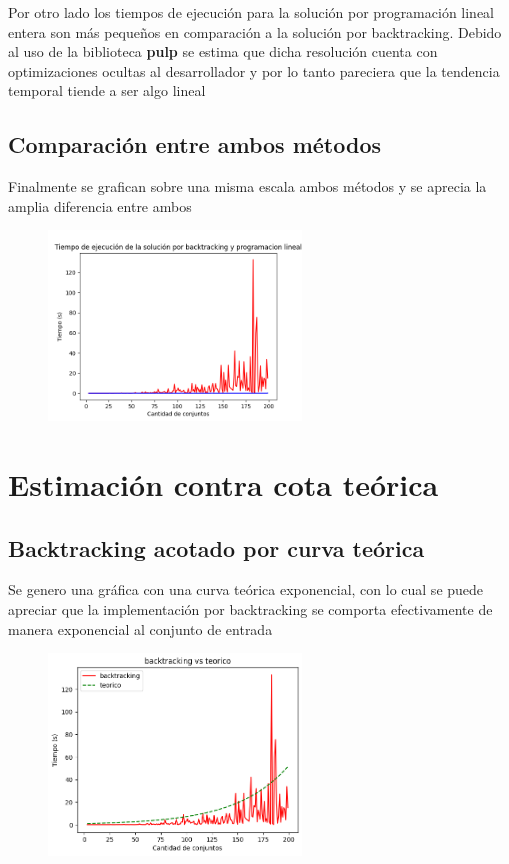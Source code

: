 Por otro lado los tiempos de ejecución para la solución por programación lineal entera son más pequeños en comparación a la solución por backtracking. Debido al uso de la biblioteca \textbf{pulp} se estima que dicha resolución cuenta con optimizaciones ocultas al desarrollador y por lo tanto pareciera que la tendencia temporal tiende a ser algo lineal 

\subsection{Comparación entre ambos métodos}

Finalmente se grafican sobre una misma escala ambos métodos y se aprecia la amplia diferencia entre ambos

\begin{figure}[H]
    \centering
    \includegraphics[width=0.6\textwidth]{graficos/ilpvsbt.png}
\end{figure}

\section{Estimación contra cota teórica}

\subsection{Backtracking acotado por curva teórica}

Se genero una gráfica con una curva teórica exponencial, con lo cual se puede apreciar que la implementación por backtracking se comporta efectivamente de manera exponencial al conjunto de entrada 

\begin{figure}[H]
    \centering
    \includegraphics[width=0.6\textwidth]{graficos/backvsteorico.png}
\end{figure}
